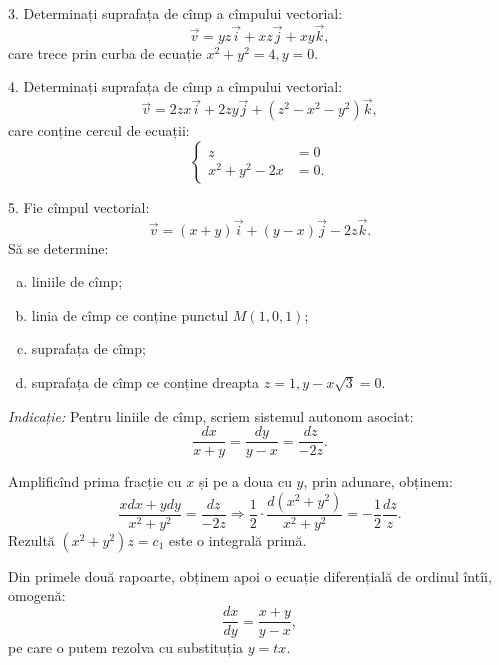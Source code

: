 \documentclass[11pt,a4paper]{article}
\theoremstyle{dotless}
\theoremstyle{dotlessdr}
\begin{document}
\vspace{1cm}

3. Determinați suprafața de cîmp a cîmpului vectorial:
\[
  \vec{v} = yz \vec{i} + xz \vec{j} + xy \vec{k},
\]
care trece prin curba de ecuație $ x^2 + y^2 = 4, y = 0 $.

\vspace{1cm}

4. Determinați suprafața de cîmp a cîmpului vectorial:
\[
  \vec{v} = 2zx\vec{i} + 2zy\vec{j} + (z^2 - x^2 - y^2) \vec{k},
\]
care conține cercul de ecuații:
\[
  \begin{cases}
    z &= 0 \\
    x^2 + y^2 - 2x &= 0.
  \end{cases}
\]

\vspace{1cm}

5. Fie cîmpul vectorial:
\[
  \vec{v} = (x + y) \vec{i} + (y - x) \vec{j} - 2z\vec{k}.
\]
Să se determine:
\begin{enumerate}[(a)]
\item liniile de cîmp;
\item linia de cîmp ce conține punctul $ M(1, 0, 1) $;
\item suprafața de cîmp;
\item suprafața de cîmp ce conține dreapta $ z = 1, y - x\sqrt{3} = 0 $.
\end{enumerate}

\emph{Indicație:} Pentru liniile de cîmp, scriem sistemul autonom asociat:
\[
  \frac{dx}{x + y} = \frac{dy}{y-x} = \frac{dz}{-2z}.
\]

Amplificînd prima fracție cu $ x $ și pe a doua cu $ y $, prin adunare, obținem:
\[
  \frac{xdx + ydy}{x^2 + y^2} = \frac{dz}{-2z} \Rightarrow %
  \frac{1}{2} \cdot \frac{d(x^2 + y^2)}{x^2 + y^2} = -\frac{1}{2} \frac{dz}{z}.
\]
Rezultă $(x^2 + y^2)z = c_1$ este o integrală primă.

Din primele două rapoarte, obținem apoi o ecuație diferențială de ordinul întîi,
omogenă:
\[
  \frac{dx}{dy} = \frac{x + y}{y - x},
\]
pe care o putem rezolva cu substituția $y = tx$.
\end{document}
